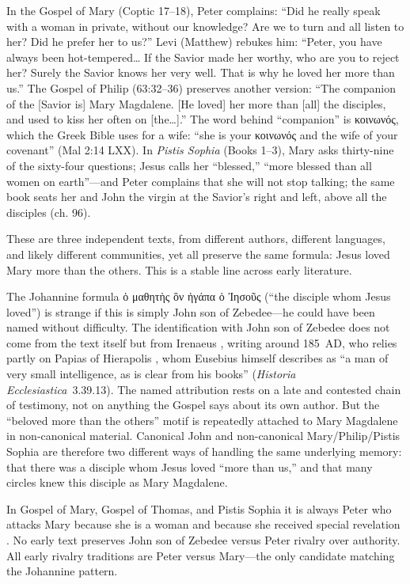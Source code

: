 In the Gospel of Mary (Coptic 17--18), Peter complains: ``Did he really speak with a woman in private, without our knowledge? Are we to turn and all listen to her? Did he prefer her to us?''
Levi (Matthew) rebukes him: ``Peter, you have always been hot-tempered\ldots{} If the Savior made her worthy, who are you to reject her? Surely the Savior knows her very well. That is why he loved her more than us.''
The Gospel of Philip (63:32--36) preserves another version: ``The companion of the [Savior is] Mary Magdalene. [He loved] her more than [all] the disciples, and used to kiss her often on [the\ldots].''
The word behind ``companion'' is κοινωνός, which the Greek Bible uses for a wife: ``she is your κοινωνός and the wife of your covenant'' (Mal 2:14 LXX).
In \emph{Pistis Sophia} (Books 1--3), Mary asks thirty-nine of the sixty-four questions; Jesus calls her ``blessed,'' ``more blessed than all women on earth''---and Peter complains that she will not stop talking; the same book seats her and John the virgin at the Savior's right and left, above all the disciples (ch. 96).

These are three independent texts, from different authors, different languages, and likely different communities, yet all preserve the same formula: Jesus loved Mary more than the others.
This is a stable line across early literature.

The Johannine formula ὁ μαθητὴς ὃν ἠγάπα ὁ Ἰησοῦς (``the disciple whom Jesus loved'') is strange if this is simply John son of Zebedee---he could have been named without difficulty.
The identification with John son of Zebedee does not come from the text itself but from Irenaeus \cite[3.1.1]{irenaeus:advhaer}, writing around 185~AD, who relies partly on Papias of Hierapolis \cite[3.39]{eusebius:he}, whom Eusebius himself describes as ``a man of very small intelligence, as is clear from his books'' (\emph{Historia Ecclesiastica}~3.39.13).
The named attribution rests on a late and contested chain of testimony, not on anything the Gospel says about its own author.
But the ``beloved more than the others'' motif is repeatedly attached to Mary Magdalene in non-canonical material.
Canonical John and non-canonical Mary/Philip/Pistis Sophia are therefore two different ways of handling the same underlying memory: that there was a disciple whom Jesus loved ``more than us,'' and that many circles knew this disciple as Mary Magdalene.

In Gospel of Mary, Gospel of Thomas, and Pistis Sophia it is always Peter who attacks Mary because she is a woman and because she received special revelation \cite{deboer:magdalene}.
No early text preserves John son of Zebedee versus Peter rivalry over authority.
All early rivalry traditions are Peter versus Mary---the only candidate matching the Johannine pattern.

